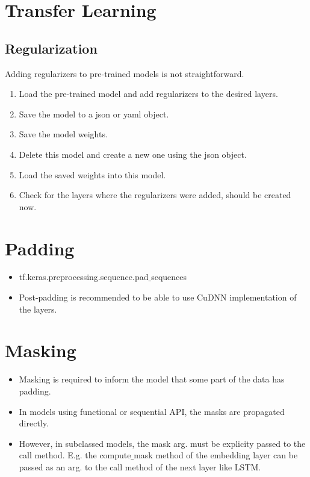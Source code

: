 \documentclass[11pt]{article}
\begin{document}
\begin{multicols*}{2}
\section{Transfer Learning}

\subsection{Regularization}
Adding regularizers to pre-trained models is not straightforward.
\begin{enumerate}
\item Load the pre-trained model and add regularizers to the desired layers.
\item Save the model to a json or yaml object.
\item Save the model weights.
\item Delete this model and create a new one using the json object.
\item Load the saved weights into this model.
\item Check for the layers where the regularizers were added, should be created now.
\end{enumerate}


\section{Padding}
\begin{itemize}
\item tf.keras.preprocessing.sequence.pad$\_$sequences
\item Post-padding is recommended to be able to use CuDNN implementation of the layers.
\end{itemize}

\section{Masking}
\begin{itemize}
\item Masking is required to inform the model that some part of the data has padding.
\item In models using functional or sequential API, the masks are propagated directly.
\item However, in subclassed models, the mask arg. must be explicity passed to the call method. E.g. the compute$\_$mask method of the embedding layer can be passed as an arg. to the call method of the next layer like LSTM.
\end{itemize}


\end{multicols*}
\end{document}
